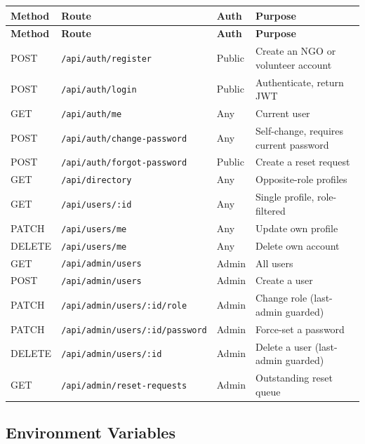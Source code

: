 \documentclass[11pt,letterpaper]{article}
\begin{document}
\begin{center}
\begin{longtable}{@{}l L{6.2cm} l X@{}}
\toprule
\textbf{Method} & \textbf{Route} & \textbf{Auth} & \textbf{Purpose}\\
\midrule
\endfirsthead
\toprule
\textbf{Method} & \textbf{Route} & \textbf{Auth} & \textbf{Purpose}\\
\midrule
\endhead
POST   & \texttt{/api/auth/register}            & Public & Create an NGO or volunteer account\\
POST   & \texttt{/api/auth/login}               & Public & Authenticate, return JWT\\
GET    & \texttt{/api/auth/me}                  & Any    & Current user\\
POST   & \texttt{/api/auth/change-password}     & Any    & Self-change, requires current password\\
POST   & \texttt{/api/auth/forgot-password}     & Public & Create a reset request\\
GET    & \texttt{/api/directory}                & Any    & Opposite-role profiles\\
GET    & \texttt{/api/users/:id}                & Any    & Single profile, role-filtered\\
PATCH  & \texttt{/api/users/me}                 & Any    & Update own profile\\
DELETE & \texttt{/api/users/me}                 & Any    & Delete own account\\
GET    & \texttt{/api/admin/users}              & Admin  & All users\\
POST   & \texttt{/api/admin/users}              & Admin  & Create a user\\
PATCH  & \texttt{/api/admin/users/:id/role}     & Admin  & Change role (last-admin guarded)\\
PATCH  & \texttt{/api/admin/users/:id/password} & Admin  & Force-set a password\\
DELETE & \texttt{/api/admin/users/:id}          & Admin  & Delete a user (last-admin guarded)\\
GET    & \texttt{/api/admin/reset-requests}     & Admin  & Outstanding reset queue\\
\bottomrule
\end{longtable}
\end{center}

\subsection{Environment Variables}
\end{document}
